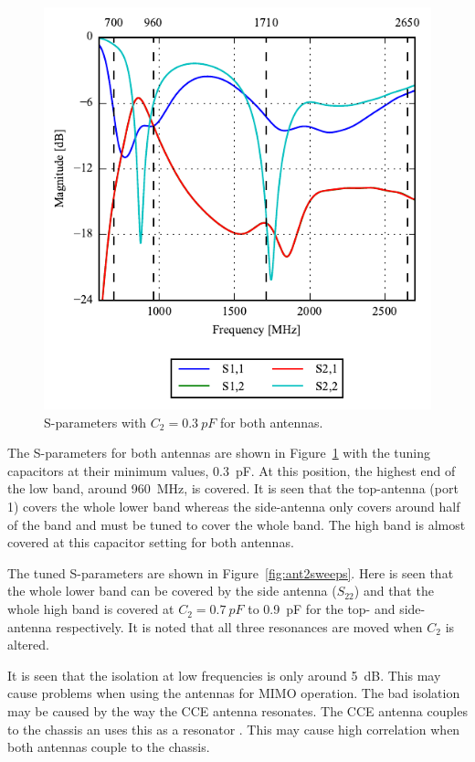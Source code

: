 \begin{figure}[htbp]
    \centering
    \includegraphics{img/tech_sol/trianglefeed/sparams}
    \caption{S-parameters with $C_2=\SI{0.3}{pF}$ for both antennas.}
    \label{fig:ant2sparams}
\end{figure}

The S-parameters for both antennas are shown in Figure~\ref{fig:ant2sparams} with the tuning capacitors at their minimum values, \SI{0.3}{pF}. At this position, the highest end of the low band, around \SI{960}{MHz}, is covered. It is seen that the top-antenna (port 1) covers the whole lower band whereas the side-antenna only covers around half of the band and must be tuned to cover the whole band. The high band is almost covered at this capacitor setting for both antennas.

The tuned S-parameters are shown in Figure~\ref{fig:ant2sweeps}. Here is seen that the whole lower band can be covered by the side antenna ($S_{22}$) and that the whole high band is covered at $C_2 = \SI{0.7}{pF}$ to \SI{0.9}{pF} for the top- and side-antenna respectively. It is noted that all three resonances are moved when $C_2$ is altered.

It is seen that the isolation at low frequencies is only around \SI{5}{dB}. This may cause problems when using the antennas for MIMO operation. The bad isolation may be caused by the way the CCE antenna resonates. The CCE antenna couples to the chassis an uses this as a resonator \cite{ilvonen2014design}. This may cause high correlation when both antennas couple to the chassis.

